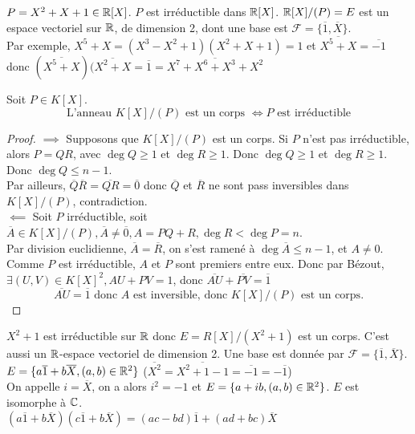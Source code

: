 \documentclass[]{report}
\begin{document}
    \begin{ex}{}{}
        $P=X^2+X+1\in \mathbb{R}[X]$. $P$ est irréductible dans $\mathbb{R}[X]$. $\mathbb{R}[X]/(P)=E$ est un espace vectoriel sur $\mathbb{R}$, de dimension 2, dont une base est $\mathcal{F}=\{\overline{1},\overline{X}\}$.\\
        Par exemple, $X^5+X=(X^3-X^2+1)(X^2+X+1)=1$ et $\overline{X^5+X}=\overline{-1}$ donc $(\overline{X^5+X})(\overline{X^2+X}=\overline{1}=\overline{X^7+X^6+X^3+X^2}$
    \end{ex}

    \begin{tm}{}{}
        Soit $P \in K[X]$. $$\text{L'anneau }K[X]/(P)\text{ est un corps }\iff P\text{ est irréductible}$$
    \end{tm}

    \begin{proof}
        $\implies$ Supposons que $K[X]/(P)$ est un corps. Si $P$ n'est pas irréductible, alors $P=QR$, avec $\deg Q \ge 1$ et $\deg R \ge 1$. Donc $\deg Q\ge 1$ et $\deg R\ge 1$. Donc $\deg Q\le n-1$.\\
        Par ailleurs, $\overline{Q}\overline{R}=\overline{QR}=\overline{0}$ donc $\overline{Q}$ et $\overline{R}$ ne sont pass inversibles dans $K[X]/(P)$, contradiction.\\
        $\impliedby$ Soit $P$ irréductible, soit $\overline{A}\in K[X]/(P),\overline{A}\neq\overline{0},A=PQ+R,\deg R<\deg P=n$.\\
        Par division euclidienne, $\overline{A}=\overline{R}$, on s'est ramené à $\deg \overline{A}\le n-1$, et $A\neq0$. \\
        Comme $P$ est irréductible, $A$ et $P$ sont premiers entre eux. Donc par Bézout, $\exists(U,V)\in K[X]^2,AU+PV=1$, donc $\overline{AU}+\overline{PV}=\overline{1}$
        \[\overline{AU}=\overline{1}\text{ donc $A$ est inversible, donc $K[X]/(P)$ est un corps.}\]
    \end{proof}

    \begin{ex}{}{}
        $X^2+1$ est irréductible sur $\mathbb{R}$ donc $E=R[X]/(X^2+1)$ est un corps. C'est aussi un $\mathbb{R}$-espace vectoriel de dimension 2. Une base est donnée par $\mathcal{F}=\{\overline{1},\overline{X}\}$.\\
        $E=\{a\overline{1}+b\overline{X},(a,b)\in\mathbb{R}^2\}$ ($\overline{X^2}=\overline{X^2+1-1}=\overline{-1}=-\overline{1}$)\\
        On appelle $i=\overline{X}$, on a alors $i^2=-1$ et $E=\{a+ib,(a,b)\in\mathbb{R}^2\}$. $E$ est isomorphe à $\mathbb{C}$.\\
        $(a\overline{1}+b\overline{X})(c\overline{1}+b\overline{X})=(ac-bd)\overline{1}+(ad+bc)\overline{X}$
    \end{ex}
\end{document}
